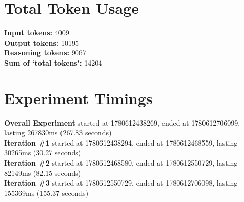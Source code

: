 \documentclass{article}
\begin{document}
\section*{Total Token Usage}
\textbf{Input tokens: }4009
\\\textbf{Output tokens: }10195
\\\textbf{Reasoning tokens: }9067
\\\textbf{Sum of `total tokens': }14204
\section*{Experiment Timings}
\textbf{Overall Experiment} started at 1780612438269, ended at 1780612706099, lasting 267830ms (267.83 seconds)
\\\textbf{Iteration \#1} started at 1780612438294, ended at 1780612468559, lasting 30265ms (30.27 seconds)
\\\textbf{Iteration \#2} started at 1780612468580, ended at 1780612550729, lasting 82149ms (82.15 seconds)
\\\textbf{Iteration \#3} started at 1780612550729, ended at 1780612706098, lasting 155369ms (155.37 seconds)
\end{document}
